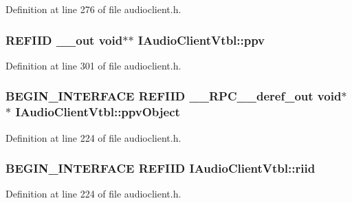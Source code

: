 Definition at line 276 of file audioclient.\+h.

\subsubsection[{\texorpdfstring{ppv}{ppv}}]{ {\bf R\+E\+F\+I\+ID} {\bf \+\_\+\+\_\+out} {\bf void}$\ast$$\ast$ I\+Audio\+Client\+Vtbl\+::ppv}\hypertarget{struct_i_audio_client_vtbl_a2a67b61de9eb0245ec3b9db4566581db}{}\label{struct_i_audio_client_vtbl_a2a67b61de9eb0245ec3b9db4566581db}


Definition at line 301 of file audioclient.\+h.

\subsubsection[{\texorpdfstring{ppv\+Object}{ppvObject}}]{\setlength{\rightskip}{0pt plus 5cm}B\+E\+G\+I\+N\+\_\+\+I\+N\+T\+E\+R\+F\+A\+CE {\bf R\+E\+F\+I\+ID} {\bf \+\_\+\+\_\+\+R\+P\+C\+\_\+\+\_\+deref\+\_\+out} {\bf void}$\ast$$\ast$ I\+Audio\+Client\+Vtbl\+::ppv\+Object}\hypertarget{struct_i_audio_client_vtbl_af28cfc2beda55dd9f19fe7c6f27dc950}{}\label{struct_i_audio_client_vtbl_af28cfc2beda55dd9f19fe7c6f27dc950}


Definition at line 224 of file audioclient.\+h.

\subsubsection[{\texorpdfstring{riid}{riid}}]{\setlength{\rightskip}{0pt plus 5cm}B\+E\+G\+I\+N\+\_\+\+I\+N\+T\+E\+R\+F\+A\+CE {\bf R\+E\+F\+I\+ID} I\+Audio\+Client\+Vtbl\+::riid}\hypertarget{struct_i_audio_client_vtbl_ab975afebe7ac3eff154b2bbde0490cf6}{}\label{struct_i_audio_client_vtbl_ab975afebe7ac3eff154b2bbde0490cf6}


Definition at line 224 of file audioclient.\+h.

